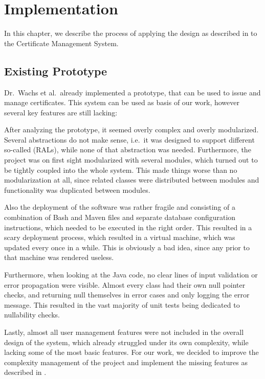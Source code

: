 \chapter{Implementation}\label{ch:implementation}
In this chapter, we describe the process of applying the design as described in  to the
Certificate Management System.

\section{Existing Prototype}\label{sec:exisingPrototype}
Dr.\ Wachs et al.\ already implemented a prototype, that can be used to issue and manage certificates.
This system can be used as basis of our work, however several key features are still lacking:

After analyzing the prototype, it seemed overly complex and overly modularized.
Several abstractions do not make sense, i.e.\ it was designed to support different so-called  (RALs), while none of that abstraction was needed.
Furthermore, the project was on first sight modularized with several  modules, which turned out to be
tightly coupled into the whole system.
This made things worse than no modularization at all, since related classes were distributed between modules and
functionality was duplicated between modules.

Also the deployment of the software was rather fragile and consisting of a combination of Bash and Maven files and
separate database configuration instructions, which needed to be executed in the right order.
This resulted in a scary deployment process, which resulted in a virtual machine, which was updated every once in a
while.
This is obviously a bad idea, since any  prior to that machine was rendered useless.

Furthermore, when looking at the Java code, no clear lines of input validation or error propagation were visible.
Almost every class had their own null pointer checks, and returning null themselves in error cases and only logging the
error message.
This resulted in the vast majority of unit tests being dedicated to nullability checks.

Lastly, almost all user management features were not included in the overall design of the system, which already
struggled under its own complexity, while lacking some of the most basic features.
For our work, we decided to improve the complexity management of the project and implement the missing features as
described in .

